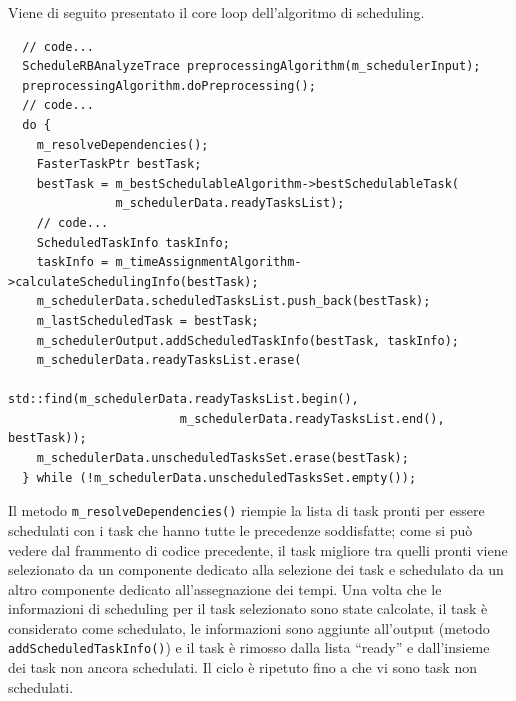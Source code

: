 Viene di seguito presentato il core loop dell'algoritmo di scheduling.
\newline
\begin{verbatim}
  // code...
  ScheduleRBAnalyzeTrace preprocessingAlgorithm(m_schedulerInput);
  preprocessingAlgorithm.doPreprocessing();
  // code...
  do {
    m_resolveDependencies();
    FasterTaskPtr bestTask;
    bestTask = m_bestSchedulableAlgorithm->bestSchedulableTask(
               m_schedulerData.readyTasksList);
    // code...
    ScheduledTaskInfo taskInfo;
    taskInfo = m_timeAssignmentAlgorithm->calculateSchedulingInfo(bestTask);
    m_schedulerData.scheduledTasksList.push_back(bestTask);
    m_lastScheduledTask = bestTask;
    m_schedulerOutput.addScheduledTaskInfo(bestTask, taskInfo);
    m_schedulerData.readyTasksList.erase(
                        std::find(m_schedulerData.readyTasksList.begin(), 
                        m_schedulerData.readyTasksList.end(), bestTask));
    m_schedulerData.unscheduledTasksSet.erase(bestTask);
  } while (!m_schedulerData.unscheduledTasksSet.empty());
\end{verbatim}

Il metodo \verb+m_resolveDependencies()+ riempie la lista di task pronti per 
essere schedulati con i task che hanno tutte le precedenze soddisfatte; come si 
può vedere dal frammento di codice precedente, il task migliore tra quelli 
pronti viene selezionato da un componente dedicato alla selezione dei task e 
schedulato da un altro componente dedicato all'assegnazione dei tempi. Una 
volta che le informazioni di scheduling per il task selezionato sono state 
calcolate, il task è considerato come schedulato, le informazioni sono aggiunte 
all'output (metodo \verb+addScheduledTaskInfo()+) e il task è rimosso dalla 
lista ``ready'' e dall'insieme dei task non ancora schedulati. Il ciclo è 
ripetuto fino a che vi sono task non schedulati.

